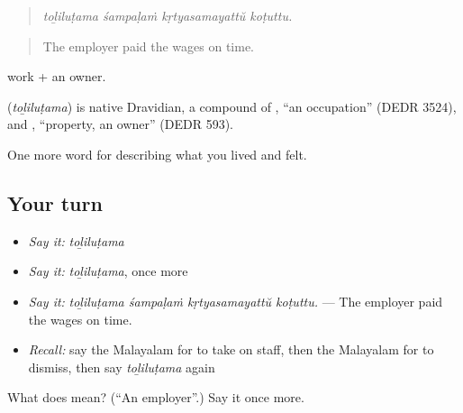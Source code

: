 \begin{quote}
\emph{toḻiluṭama śampaḷaṁ kṛtyasamayattŭ koṭuttu.}
\end{quote}

\begin{quote}
The employer paid the wages on time.
\end{quote}

 work +  an owner.

\begin{cousinweb}
\textbf{} (\emph{toḻiluṭama}) is native Dravidian, a compound of , \textquotedblleft{}an occupation\textquotedblright{} (DEDR 3524), and , \textquotedblleft{}property, an owner\textquotedblright{} (DEDR 593).
\end{cousinweb}

\begin{grammarlens}[title={What you've built}]
One more word for describing what you lived and felt.
\end{grammarlens}

\subsection*{Your turn}
\begin{itemize}
\raggedright
  \item \emph{Say it:} \emph{toḻiluṭama}
  \item \emph{Say it:} \emph{toḻiluṭama}, once more
  \item \emph{Say it:} \emph{toḻiluṭama śampaḷaṁ kṛtyasamayattŭ koṭuttu.} — The employer paid the wages on time.
  \item \emph{Recall:} say the Malayalam for to take on staff, then the Malayalam for to dismiss, then say \emph{toḻiluṭama} again
\end{itemize}

\begin{tcolorbox}[breakable,colback=teal!4,colframe=teal!35!black,title={Before you move on}]
What does  mean? (\textquotedblleft{}An employer\textquotedblright{}.) Say it once more.
\end{tcolorbox}
